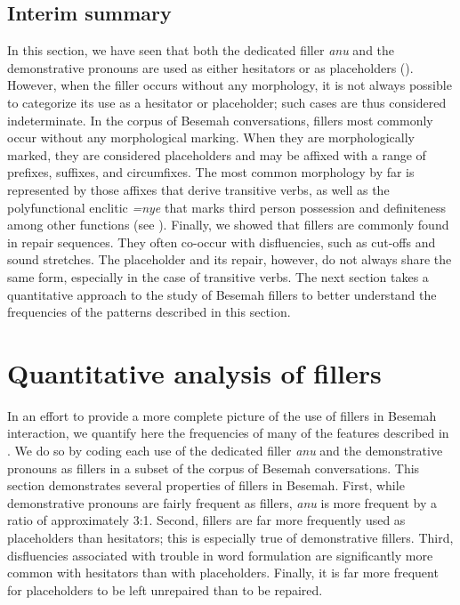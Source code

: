 \documentclass[output=paper,
\ChapterDOI{10.5281/zenodo.15697583}
colorlinks,
citecolor=brown]{langscibook}
\begin{document}

\subsection{Interim summary}
In this section, we have seen that both the dedicated filler \textit{anu} and the demonstrative pronouns are used as either hesitators or as placeholders (). However, when the filler occurs without any morphology, it is not always possible to categorize its use as a hesitator or placeholder; such cases are thus considered indeterminate. In the corpus of Besemah conversations, fillers most commonly occur without any morphological marking. When they are morphologically marked, they are considered placeholders and may be affixed with a range of prefixes, suffixes, and circumfixes. The most common morphology by far is represented by those affixes that derive transitive verbs, as well as the polyfunctional enclitic \textit{=nye} that marks third person possession and definiteness among other functions (see ). Finally, we showed that fillers are commonly found in repair sequences. They often co-occur with disfluencies, such as cut-offs and sound stretches. The placeholder and its repair, however, do not always share the same form, especially in the case of transitive verbs. The next section takes a quantitative approach to the study of Besemah fillers to better understand the frequencies of the patterns described in this section.

\section{Quantitative analysis of fillers}\label{sec:quantitative}
In an effort to provide a more complete picture of the use of fillers in Besemah interaction, we quantify here the frequencies of many of the features described in . We do so by coding each use of the dedicated filler \textit{anu} and the demonstrative pronouns as fillers in a subset of the corpus of Besemah conversations. This section demonstrates several properties of fillers in Besemah. First, while demonstrative pronouns are fairly frequent as fillers, \textit{anu} is more frequent by a ratio of approximately 3:1. Second, fillers are far more frequently used as placeholders than hesitators; this is especially true of demonstrative fillers. Third, disfluencies associated with trouble in word formulation are significantly more common with hesitators than with placeholders. Finally, it is far more frequent for placeholders to be left unrepaired than to be repaired.
\end{document}
